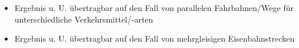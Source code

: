\documentclass[../main/thesis.tex]{subfiles}
\begin{document}
\begin{itemize}
	\item Ergebnis u. U. übertragbar auf den Fall von parallelen Fahrbahnen/Wege für unterschiedliche Verkehrsmittel/-arten
	
	\item Ergebnis u. U. übertragbar auf den Fall von mehrgleisigen Eisenbahnstrecken
	
\end{itemize}



\end{document}
